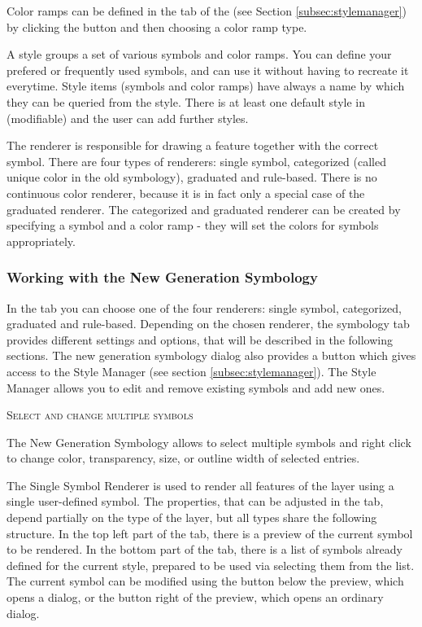 Color ramps can be defined in the  tab of the  
(see Section \ref{subsec:stylemanager}) by clicking the  button and then choosing a color ramp type.


A style groups a set of various symbols and color ramps. You can define your
prefered or frequently used symbols, and can use it  without having to recreate
it everytime. Style items (symbols and color ramps) have always a name by which
they can be queried from the style. There is at least one default style in \qg 
(modifiable) and the user can add further styles.


The renderer is responsible for drawing a feature together with the correct
symbol. There are four types of renderers: single symbol, categorized (called
unique color in the old symbology), graduated and rule-based. There is no continuous 
color renderer, because it is in fact only a special case of the graduated renderer.
The categorized and graduated renderer can be created by specifying a symbol
and a color ramp - they will set the colors for symbols appropriately.

\subsubsection{Working with the New Generation Symbology}\label{new_generation_sym}

In the  tab you can choose one of the four renderers: single symbol, 
categorized, graduated and rule-based. Depending on the chosen renderer, the 
symbology tab provides different settings and options, that will be described 
in the following sections. The new generation symbology dialog also provides 
a  button which gives access to the Style Manager 
(see section \ref{subsec:stylemanager}). The Style Manager allows you to 
edit and remove existing symbols and add new ones.
 
\begin{Tip}\caption{\textsc{Select and change multiple symbols}} 
The New Generation Symbology allows to select multiple symbols and right click to change 
color, transparency, size, or outline width of selected entries.
\end{Tip}


The Single Symbol Renderer is used to render all features of the layer using a
single user-defined symbol. The properties, that can be adjusted in the
 tab, depend partially on the type of the layer, but all types share
the following structure. In the top left part of the tab, there is a preview of
the current symbol to be rendered. In the bottom part of the tab, there is a
list of symbols already defined for the current style, prepared to be used via
selecting them from the list. The current symbol can be modified using the
 button below the preview, which opens a  
dialog, or the  button right of the preview, which opens an ordinary 
 dialog. 


